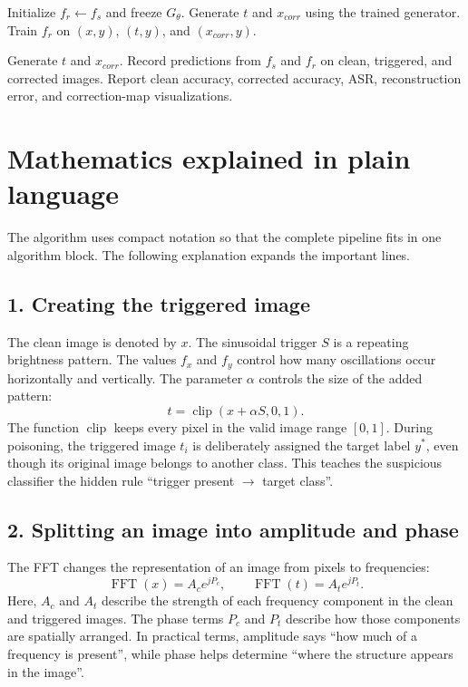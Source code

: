 \documentclass[11pt]{article}
\begin{document}
\begin{algorithm}[t]
\begin{algorithmic}[1]
\State Initialize $f_r\gets f_s$ and freeze $G_\theta$.
        \State Generate $t$ and $x_{corr}$ using the trained generator.
        \State Train $f_r$ on $(x,y)$, $(t,y)$, and $(x_{corr},y)$.
    \EndFor
\EndFor

    \State Generate $t$ and $x_{corr}$.
    \State Record predictions from $f_s$ and $f_r$ on clean, triggered,
    and corrected images.
\EndFor
\State Report clean accuracy, corrected accuracy, ASR, reconstruction error,
and correction-map visualizations.
\end{algorithmic}
\end{algorithm}

\section*{Mathematics explained in plain language}
The algorithm uses compact notation so that the complete pipeline fits in one
algorithm block. The following explanation expands the important lines.

\subsection*{1. Creating the triggered image}
The clean image is denoted by $x$. The sinusoidal trigger $S$ is a repeating
brightness pattern. The values $f_x$ and $f_y$ control how many oscillations
occur horizontally and vertically. The parameter $\alpha$ controls the size of
the added pattern:
\begin{equation}
    t=\operatorname{clip}(x+\alpha S,0,1).
\end{equation}
The function $\operatorname{clip}$ keeps every pixel in the valid image range
$[0,1]$. During poisoning, the triggered image $t_i$ is deliberately assigned
the target label $y^*$, even though its original image belongs to another
class. This teaches the suspicious classifier the hidden rule
``trigger present $\rightarrow$ target class''.

\subsection*{2. Splitting an image into amplitude and phase}
The FFT changes the representation of an image from pixels to frequencies:
\begin{equation}
    \operatorname{FFT}(x)=A_c e^{jP_c},
    \qquad
    \operatorname{FFT}(t)=A_t e^{jP_t}.
\end{equation}
Here, $A_c$ and $A_t$ describe the strength of each frequency component in the
clean and triggered images. The phase terms $P_c$ and $P_t$ describe how those
components are spatially arranged. In practical terms, amplitude says ``how
much of a frequency is present'', while phase helps determine ``where the
structure appears in the image''.
\end{document}
